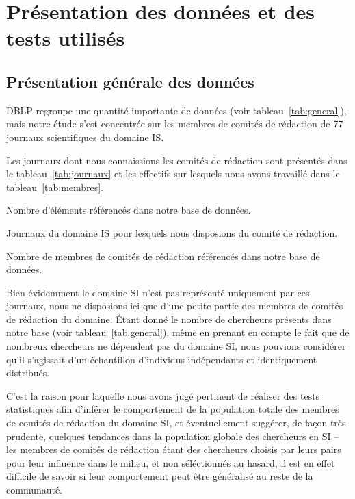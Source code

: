 		
	\section{Présentation des données et des tests utilisés}
		
		\subsection{Présentation générale des données}
			DBLP regroupe une quantité importante de données (voir tableau~\ref{tab:general}), mais notre étude s'est concentrée sur les membres de comités de rédaction de 77 journaux scientifiques du domaine IS.
			
			Les journaux dont nous connaissions les comités de rédaction sont présentés dans le tableau~\ref{tab:journaux} et les effectifs sur lesquels nous avons travaillé dans le tableau~\ref{tab:membres}.
		
			\begin{table}[h]
				\centering
				\caption{Nombre d'éléments référencés dans notre base de données.}\label{tab:general}
				
			\end{table}
		
			\begin{table}[p]
				\centering
				\caption{Journaux du domaine IS pour lesquels nous disposions du comité de rédaction.}\label{tab:journaux}
				
			\end{table}
		
			\begin{table}[h]
				\centering
				\caption{Nombre de membres de comités de rédaction référencés dans notre base de données.}\label{tab:membres}
				
			\end{table}
			
			Bien évidemment le domaine SI n'est pas représenté uniquement par ces journaux, nous ne disposions ici que d'une petite partie des membres de comités de rédaction du domaine. Étant donné le nombre de chercheurs présents dans notre base (voir tableau~\ref{tab:general}), même en prenant en compte le fait que de nombreux chercheurs ne dépendent pas du domaine SI, nous pouvions considérer qu'il s'agissait d'un échantillon d'individus indépendants et identiquement distribués.
			
			C'est la raison pour laquelle nous avons jugé pertinent de réaliser des tests statistiques afin d'inférer le comportement de la population totale des membres de comités de rédaction du domaine SI, et éventuellement suggérer, de façon très prudente, quelques tendances dans la population globale des chercheurs en SI -- les membres de comités de rédaction étant des chercheurs choisis par leurs pairs pour leur influence dans le milieu, et non séléctionnés au hasard, il est en effet difficile de savoir si leur comportement peut être généralisé au reste de la communauté.
			
